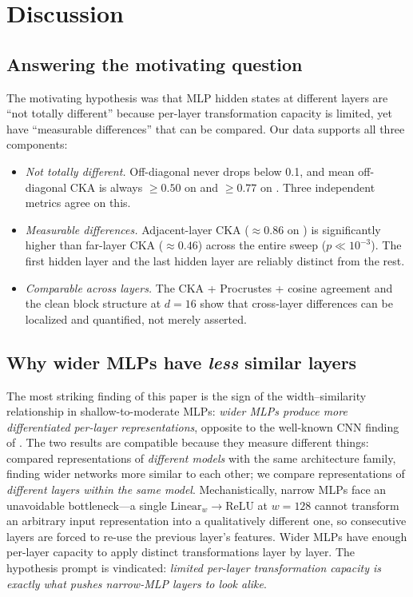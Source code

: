 \section{Discussion}
\label{sec:discussion}

\subsection{Answering the motivating question}

The motivating hypothesis was that MLP hidden states at different layers are ``not totally different'' because per-layer transformation capacity is limited, yet have ``measurable differences'' that can be compared. Our data supports all three components:

\begin{itemize}[leftmargin=*,itemsep=0pt,topsep=0pt]
    \item \emph{Not totally different.} Off-diagonal \ckam never drops below 0.1, and mean off-diagonal CKA is always $\geq\!0.50$ on \cifar and $\geq\!0.77$ on \mnist. Three independent metrics agree on this.
    \item \emph{Measurable differences.} Adjacent-layer CKA ($\approx\!0.86$ on \cifar) is significantly higher than far-layer CKA ($\approx\!0.46$) across the entire sweep ($p\!\ll\!10^{-3}$). The first hidden layer and the last hidden layer are reliably distinct from the rest.
    \item \emph{Comparable across layers.} The CKA + Procrustes + cosine agreement and the clean block structure at $d\!=\!16$ show that cross-layer differences can be localized and quantified, not merely asserted.
\end{itemize}

\subsection{Why wider MLPs have \emph{less} similar layers}

The most striking finding of this paper is the sign of the width--similarity relationship in shallow-to-moderate MLPs: \emph{wider MLPs produce more differentiated per-layer representations}, opposite to the well-known CNN finding of \citet{kornblith2019similarity}. The two results are compatible because they measure different things: \citet{kornblith2019similarity} compared representations of \emph{different models} with the same architecture family, finding wider networks more similar to each other; we compare representations of \emph{different layers within the same model}. Mechanistically, narrow MLPs face an unavoidable bottleneck---a single $\mathrm{Linear}_w \to \mathrm{ReLU}$ at $w\!=\!128$ cannot transform an arbitrary input representation into a qualitatively different one, so consecutive layers are forced to re-use the previous layer's features. Wider MLPs have enough per-layer capacity to apply distinct transformations layer by layer. The hypothesis prompt is vindicated: \emph{limited per-layer transformation capacity is exactly what pushes narrow-MLP layers to look alike}.

